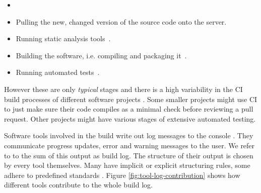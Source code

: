 \documentclass[\myrootdir/main.tex]{subfiles}
\begin{document}
\begin{itemize}
	\item {}
	\item Pulling the new, changed version of the source code onto the server.
	\item Running static analysis tools~\cite{zampetti2017open}.
	\item Building the software, i.e. compiling and packaging it~\cite{phillips2014understanding}.
	\item Running automated tests~\cite{beller2017oops}.
\end{itemize}

However these are only \emph{typical} stages and there is a high variability in the CI build processes of different software projects .
Some smaller projects might use CI to just make sure their code compiles as a minimal check before reviewing a pull request.
Other projects might have various stages of extensive automated testing.

Software tools involved in the build write out log messages to the console .
They communicate progress updates, error and warning messages to the user.
We refer to to the sum of this output as build log.
The structure of their output is chosen by every tool themselves.
Many have implicit or explicit structuring rules, some adhere to predefined standards .
Figure \ref{fig:tool-log-contribution} shows how different tools contribute to the whole build log.
\end{document}
